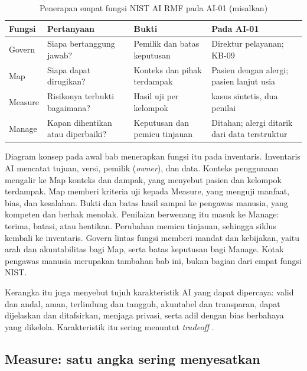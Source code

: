 \begin{table}[!htb]
  \centering\small
  \caption{Penerapan empat fungsi NIST AI RMF pada AI-01 (misalkan)}\label{tab:ch11-airmf}
  \begin{tabularx}{\textwidth}{|>{\raggedright\arraybackslash}p{}|>{\raggedright\arraybackslash}X|>{\raggedright\arraybackslash}X|>{\raggedright\arraybackslash}X|}
    \hline
    \textbf{Fungsi} & \textbf{Pertanyaan} & \textbf{Bukti} & \textbf{Pada AI-01} \\ \hline
    Govern & Siapa bertanggung jawab? & Pemilik dan batas keputusan & Direktur pelayanan; KB-09 \\
    \hline
    Map & Siapa dapat dirugikan? & Konteks dan pihak terdampak & Pasien dengan alergi; pasien
    lanjut usia \\ \hline
    Measure & Risikonya terbukti bagaimana? & Hasil uji per kelompok & 100 kasus sintetis, dua
    penilai \\ \hline
    Manage & Kapan dihentikan atau diperbaiki? & Keputusan dan pemicu tinjauan & Ditahan; alergi
    ditarik dari data terstruktur \\ \hline
  \end{tabularx}
\end{table}

Diagram konsep pada awal bab menerapkan fungsi itu pada inventaris. Inventaris AI mencatat tujuan,
versi, pemilik (\textit{owner}), dan data. Konteks penggunaan mengalir ke Map konteks dan dampak,
yang menyebut pasien dan kelompok terdampak. Map memberi kriteria uji kepada Measure, yang menguji
manfaat, bias, dan kesalahan. Bukti dan batas hasil sampai ke pengawas manusia, yang kompeten dan
berhak menolak. Penilaian berwenang itu masuk ke Manage: terima, batasi, atau hentikan. Perubahan
memicu tinjauan, sehingga siklus kembali ke inventaris. Govern lintas fungsi memberi mandat dan
kebijakan, yaitu arah dan akuntabilitas bagi Map, serta batas keputusan bagi Manage. Kotak pengawas
manusia merupakan tambahan bab ini, bukan bagian dari empat fungsi NIST.

Kerangka itu juga menyebut tujuh karakteristik AI yang dapat dipercaya: valid dan andal, aman,
terlindung dan tangguh, akuntabel dan transparan, dapat dijelaskan dan ditafsirkan, menjaga privasi,
serta adil dengan bias berbahaya yang dikelola. Karakteristik itu sering menuntut \textit{tradeoff}
\cite{c11-nist-airmf}.

\subsection*{Measure: satu angka sering menyesatkan}

